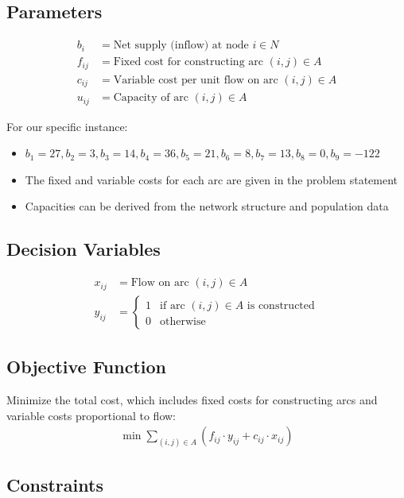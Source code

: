 \documentclass{article}
\begin{document}
\subsection{Parameters}
\begin{align}
    b_i &= \text{Net supply (inflow) at node $i \in N$} \\
    f_{ij} &= \text{Fixed cost for constructing arc $(i,j) \in A$} \\
    c_{ij} &= \text{Variable cost per unit flow on arc $(i,j) \in A$} \\
    u_{ij} &= \text{Capacity of arc $(i,j) \in A$}
\end{align}

For our specific instance:
\begin{itemize}
    \item $b_1 = 27, b_2 = 3, b_3 = 14, b_4 = 36, b_5 = 21, b_6 = 8, b_7 = 13, b_8 = 0, b_9 = -122$
    \item The fixed and variable costs for each arc are given in the problem statement
    \item Capacities can be derived from the network structure and population data
\end{itemize}

\subsection{Decision Variables}
\begin{align}
    x_{ij} &= \text{Flow on arc $(i,j) \in A$} \\
    y_{ij} &=
    \begin{cases}
        1 & \text{if arc $(i,j) \in A$ is constructed} \\
        0 & \text{otherwise}
    \end{cases}
\end{align}

\subsection{Objective Function}
Minimize the total cost, which includes fixed costs for constructing arcs and variable costs proportional to flow:
\begin{align}
    \min \sum_{(i,j) \in A} (f_{ij} \cdot y_{ij} + c_{ij} \cdot x_{ij})
\end{align}

\subsection{Constraints}
\end{document}
